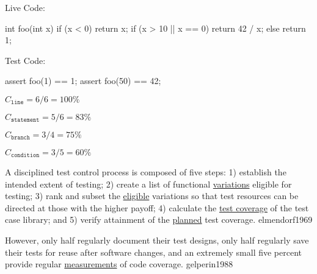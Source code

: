 \documentclass{article}
\begin{document}
\begin{multicols}{2}
Live Code:\par
{\small\begin{ffcode}
int foo(int x) {
  if (x < 0) { return x; }
  if (x > 10 || x == 0) {
    return 42 / x;
  } else {
    return 1;
  }
}
\end{ffcode}
}
\par\columnbreak\par
Test Code:\par
{\small\begin{ffcode}
assert foo(1) == 1;
assert foo(50) == 42;
\end{ffcode}
}
\( C_{\texttt{line}} = 6/6 = 100\% \)\par
\( C_{\texttt{statement}} = 5/6 = 83\% \)\par
\( C_{\texttt{branch}} = 3/4 = 75\% \)\par
\( C_{\texttt{condition}} = 3/5 = 60\% \)\par
\end{multicols}
\plush{}

  {A disciplined test control process is composed of five steps: 1) establish the intended extent of testing; 2) create a list of functional \ul{variations} eligible for testing; 3) rank and subset the \ul{eligible} variations so that test resources can be directed at those with the higher payoff; 4) calculate the \ul{test coverage} of the test case library; and 5) verify attainment of the \ul{planned} test coverage.}
  {elmendorf1969}

  {However, only half regularly document their test designs, only half regularly save their tests for reuse after software changes, and an extremely small five percent provide regular \ul{measurements} of code coverage.}
  {gelperin1988}

\end{document}
